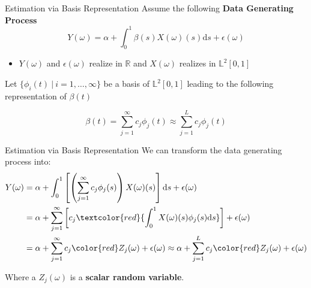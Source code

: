 \documentclass{beamer}
\begin{document}
	\begin{frame}{Estimation via Basis Representation}
		Assume the following \textbf{Data Generating Process}
		$$Y(\omega) = \alpha + \int_{0}^{1} \beta(s) X(\omega)(s) \mathrm{d}s + \epsilon(\omega)$$
		\vspace{-0.6cm}
		\begin{itemize}
			\item $Y(\omega)$ and $\epsilon(\omega)$ realize in $\mathbb{R}$ and $X(\omega)$ realizes in $\mathbb{L}^2[0,1]$
		\end{itemize}
		\vspace{0.3cm}
					
		Let $\{\phi_i(t) \: \vert \: i = 1, \dots, \infty\}$ be a basis of $\mathbb{L}^2[0,1]$ leading to the following representation of $\beta(t)$
		
		$$\beta(t) = \sum_{j = 1}^{\infty} c_j \phi_j(t) \approx \sum_{j = 1}^{L} c_j \phi_j(t)$$

	\end{frame}

	\begin{frame}{Estimation via Basis Representation}
		We can transform the data generating process into:
		\begin{equation}\notag
			\begin{split}
				Y(\omega) & = \alpha + \int_{0}^{1}\left[\left(\sum_{j = 1}^{\infty} c_j  \phi_j(s)\right) X(\omega)(s) \right]\mathrm{d}s + \epsilon(\omega) \\
						  & = \alpha + \sum_{j = 1}^{\infty} \left[c_j \textcolor{red}{\int_{0}^{1} X(\omega)(s) \phi_j(s)\mathrm{d}s}\right] + \epsilon(\omega)	 \\
						  & = \alpha + \sum_{j = 1}^{\infty} c_j {\color{red}Z_j(\omega)} + \epsilon(\omega)  \approx  \alpha + \sum_{j = 1}^{L} c_j {\color{red}Z_j(\omega)}  + \epsilon(\omega)
			\end{split}
		\end{equation}
	
		Where a $Z_j(\omega)$ is a \textbf{scalar random variable}.
	\end{frame}
\end{document}
